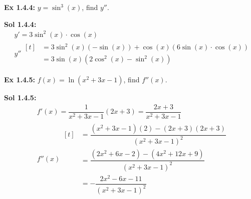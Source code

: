 \begin{tcolorbox}[example]
    \textbf{Ex 1.4.4: } $y = \sin^3 (x)$, find $y''$.
\end{tcolorbox}
\begin{tcolorbox}[solution] 
    \textbf{Sol 1.4.4: } \begin{align*}
        & y' = 3\sin^2 (x) \cdot \cos (x) \\[11pt]
        & y'' \begin{aligned}[t]
            & = 3\sin^2 (x)(-\sin (x)) + \cos (x)(6\sin (x) \cdot \cos (x)) \\[11pt]
            & = \boxed{3 \sin (x)\left(2\cos^2(x) - \sin^2(x)\right)}
        \end{aligned}
    \end{align*}
\end{tcolorbox} \vspace{11pt}

\begin{tcolorbox}[example]
    \textbf{Ex 1.4.5: } $f(x) = \ln \left(x^2 + 3x - 1\right)$, find $f''(x)$.
\end{tcolorbox}
\begin{tcolorbox}[solution]
    \textbf{Sol 1.4.5: } \begin{align*}
        & f'(x) = \dfrac{1}{x^2 + 3x - 1}\left(2x + 3\right) = \dfrac{2x + 3}{x^2 + 3x - 1} \\[11pt]
        & f''(x) \begin{aligned}[t]
            & = \dfrac{\left(x^2 + 3x - 1\right)(2) - (2x + 3)(2x + 3)}{\left(x^2 + 3x - 1\right)^2} \\[11pt]
            & = \dfrac{\left(2x^2 + 6x - 2\right) - \left(4x^2 + 12x + 9\right)}{\left(x^2 + 3x - 1\right)^2} \\[11pt]
            & = \boxed{-\dfrac{2x^2 - 6x - 11}{\left(x^2 + 3x - 1\right)^2}}
        \end{aligned}
    \end{align*}
\end{tcolorbox} \vspace{11pt}

